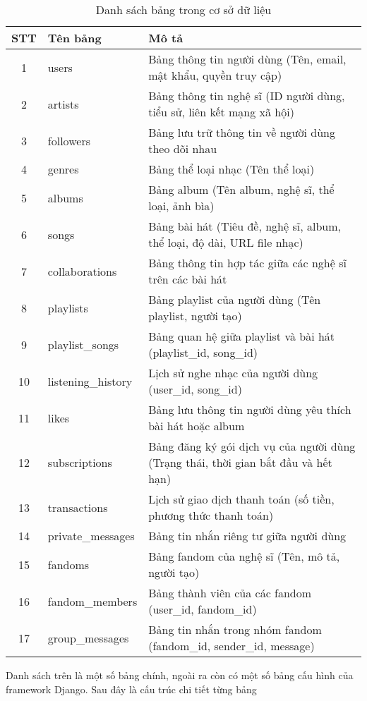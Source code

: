 \documentclass[a4paper]{article}
\begin{document}
\begin{table}
    \centering
    \label{tab:danh-sach-bang}
    \begin{tabular}{|c|l|p{8cm}|}
        \hline
        \textbf{STT} & \textbf{Tên bảng} & \textbf{Mô tả} \\
        \hline
        1 & users & Bảng thông tin người dùng (Tên, email, mật khẩu, quyền truy cập) \\
        2 & artists & Bảng thông tin nghệ sĩ (ID người dùng, tiểu sử, liên kết mạng xã hội) \\
        3 & followers & Bảng lưu trữ thông tin về người dùng theo dõi nhau \\
        4 & genres & Bảng thể loại nhạc (Tên thể loại) \\
        5 & albums & Bảng album (Tên album, nghệ sĩ, thể loại, ảnh bìa) \\
        6 & songs & Bảng bài hát (Tiêu đề, nghệ sĩ, album, thể loại, độ dài, URL file nhạc) \\
        7 & collaborations & Bảng thông tin hợp tác giữa các nghệ sĩ trên các bài hát \\
        8 & playlists & Bảng playlist của người dùng (Tên playlist, người tạo) \\
        9 & playlist\_songs & Bảng quan hệ giữa playlist và bài hát (playlist_id, song_id) \\
        10 & listening\_history & Lịch sử nghe nhạc của người dùng (user_id, song_id) \\
        11 & likes & Bảng lưu thông tin người dùng yêu thích bài hát hoặc album \\
        12 & subscriptions & Bảng đăng ký gói dịch vụ của người dùng (Trạng thái, thời gian bắt đầu và hết hạn) \\
        13 & transactions & Lịch sử giao dịch thanh toán (số tiền, phương thức thanh toán) \\
        14 & private\_messages & Bảng tin nhắn riêng tư giữa người dùng \\
        15 & fandoms & Bảng fandom của nghệ sĩ (Tên, mô tả, người tạo) \\
        16 & fandom\_members & Bảng thành viên của các fandom (user_id, fandom_id) \\
        17 & group\_messages & Bảng tin nhắn trong nhóm fandom (fandom_id, sender_id, message) \\
        \hline
    \end{tabular}
    \caption{Danh sách bảng trong cơ sở dữ liệu}
\end{table}
Danh sách trên là một số bảng chính, ngoài ra còn có một số bảng cấu hình của framework Django. Sau đây là cấu trúc chi tiết từng bảng\\
\end{document}
